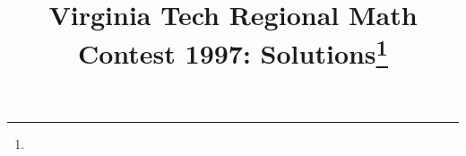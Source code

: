 \documentclass[10pt]{article}
\begin{document}
\title{Virginia Tech Regional Math Contest 1997: Solutions\footnote{\disclaimer}}
\author{\vspace{-2ex}}
\date{\vspace{-5ex}} %
\maketitle

%

%

%

%

%

%

%
\end{document}
